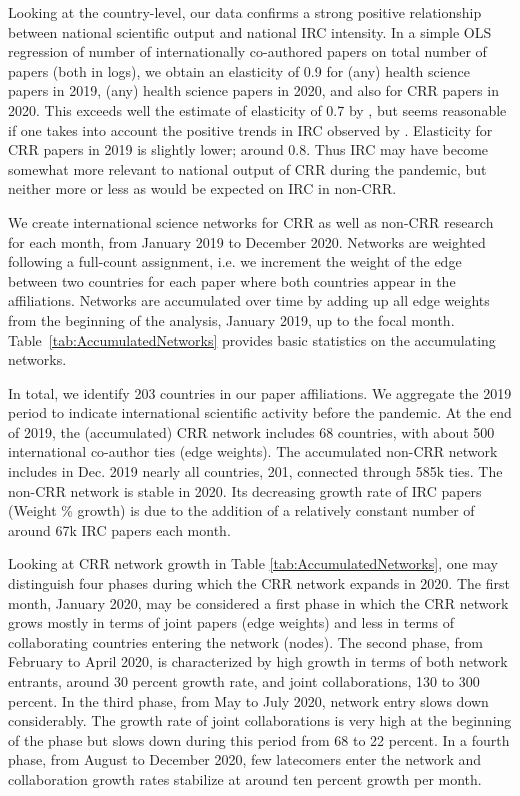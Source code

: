 Looking at the country-level, our data confirms a strong positive relationship between national scientific output and national IRC intensity. In a simple OLS regression of number of internationally co-authored papers on total number of papers (both in logs), we obtain an elasticity of 0.9 for (any) health science papers in 2019, (any) health science papers in 2020, and also for CRR papers in 2020. This exceeds well the estimate of elasticity of 0.7 by \citep{davidson1979international,luukkonen1992understanding}, but seems reasonable if one takes into account the positive trends in IRC observed by \cite{adams2013fourth}. Elasticity for CRR papers in 2019 is slightly lower; around 0.8. Thus IRC may have become somewhat more relevant to national output of CRR during the pandemic, but neither more or less as would be expected on IRC in non-CRR. 

We create international science networks for CRR as well as non-CRR research for each month, from January 2019 to December 2020. Networks are weighted following a full-count assignment, i.e. we increment the weight of the edge between two countries for each paper where both countries appear in the affiliations. Networks are accumulated over time by adding up all edge weights from the beginning of the analysis, January 2019, up to the focal month. Table~\ref{tab:AccumulatedNetworks} provides basic statistics on the accumulating networks. 

In total, we identify 203 countries in our paper affiliations. We aggregate the 2019 period to indicate international scientific activity before the pandemic. At the end of 2019, the (accumulated) CRR network includes 68 countries, with about 500 international co-author ties (edge weights). The accumulated non-CRR network includes in Dec. 2019 nearly all countries, 201, connected through 585k ties. The non-CRR network is stable in 2020. Its decreasing growth rate of IRC papers (Weight \% growth) is due to the addition of a relatively constant number of around 67k IRC papers each month.

Looking at CRR network growth in Table \ref{tab:AccumulatedNetworks}, one may distinguish four phases during which the CRR network expands in 2020. The first month, January 2020, may be considered a first phase in which the CRR network grows mostly in terms of joint papers (edge weights) and less in terms of collaborating countries entering the network (nodes). The second phase, from February to April 2020, is characterized by high growth in terms of both network entrants, around 30 percent growth rate, and joint collaborations, 130 to 300 percent. In the third phase, from May to July 2020, network entry slows down considerably. The growth rate of joint collaborations is very high at the beginning of the phase but slows down during this period from 68 to 22 percent. In a fourth phase, from August to December 2020, few latecomers enter the network and collaboration growth rates stabilize at around ten percent growth per month.  


